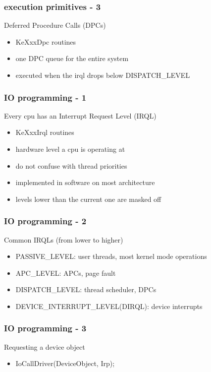 
\begin{frame}
 \frametitle{execution primitives - 3}

 Deferred Procedure Calls (DPCs)

 \begin{itemize}
  \item KeXxxDpc routines
  \item one DPC queue for the entire system
  \item executed when the irql drops below DISPATCH\_LEVEL
 \end{itemize}

\end{frame}


\begin{frame}
 \frametitle{IO programming - 1}

 Every cpu has an Interrupt Request Level (IRQL)

 \begin{itemize}
  \item KeXxxIrql routines
  \item hardware level a cpu is operating at
  \item do not confuse with thread priorities
  \item implemented in software on most architecture
  \item levels lower than the current one are masked off
 \end{itemize}

\end{frame}


\begin{frame}
 \frametitle{IO programming - 2}

 Common IRQLs (from lower to higher)

 \begin{itemize}
  \item PASSIVE\_LEVEL: user threads, most kernel mode operations
  \item APC\_LEVEL: APCs, page fault
  \item DISPATCH\_LEVEL: thread scheduler, DPCs
  \item DEVICE\_INTERRUPT\_LEVEL(DIRQL): device interrupts
 \end{itemize}

\end{frame}


\begin{frame}
 \frametitle{IO programming - 3}

 Requesting a device object

 \begin{itemize}
  \item IoCallDriver(DeviceObject, Irp);
 \end{itemize}

\end{frame}

